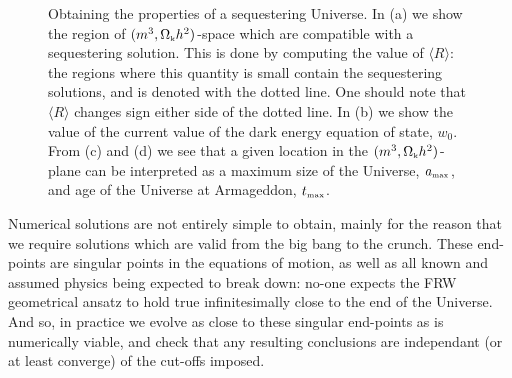 \documentclass[amsmath,amssymb,10pt,twocolumn,eqsecnum]{revtex4}
\begin{document}
\begin{figure}[!t]
\begin{center}
      \end{center}
\caption{Obtaining the  properties of a sequestering Universe.  In (a) we  show the region of $(m^3,{\Omega}_{\scriptscriptstyle{\textrm{k}}}h^2)$-space which are compatible with a sequestering solution. This is done by computing the value of $\langle R\rangle$: the regions where this quantity is small contain the sequestering solutions, and is denoted with the dotted line. One should note that $\langle R\rangle$ changes sign either side of the dotted line. In (b) we show the value of the current value of the dark energy equation of state, $w_0$.  From (c) and (d) we see that a given location in the $(m^3,{\Omega}_{\scriptscriptstyle{\textrm{k}}}h^2)$-plane can be interpreted as a maximum size of the Universe,   ${a}_{\scriptscriptstyle{\textrm{max}}}$, and age of the Universe at Armageddon, ${t}_{\scriptscriptstyle{\textrm{max}}}$.}\label{fig:plots3}
\end{figure}

 
 
%

Numerical solutions are not entirely simple to obtain, mainly for the reason that we require solutions which are valid from the big bang to the crunch. These end-points are singular points in the equations of motion, as well as all known and assumed physics being expected to break down: no-one expects the FRW geometrical ansatz to hold true infinitesimally close to the end of the Universe. And so, in practice we evolve as close to these singular end-points as is numerically viable, and check that any resulting conclusions are independant (or at least converge) of the cut-offs imposed.
 
\end{document}
